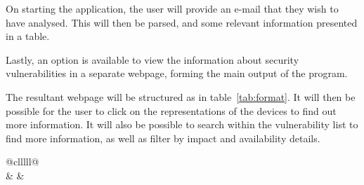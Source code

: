\documentclass[twoside,10pt]{scrreprt}
\begin{document}
On starting the application, the user will provide an e-mail that they wish to have analysed.  This will then be parsed, and some relevant information presented in a table. 

Lastly, an option is available to view the information about security vulnerabilities in a separate webpage, forming the main output of the program.

The resultant webpage will be structured as in table~\ref{tab:format}.  It will then be possible for the user to click on the representations of the devices to find out more information.  It will also be possible to search within the vulnerability list to find more information, as well as filter by impact and availability details.

\begin{table}[]
\centering
\begin{tabular}{@{}clllll@{}}
\toprule
{}                                                                                                                                                                                                                                      \\ \midrule
{} &  &  \\
                                                                                                                                                                                                \\
                                                                                                                                                                                  \\
                                                  \\
                                                                                                                                                                                                            \\ \bottomrule
\end{tabular}
\caption{Format of presented data found in e-mail header}
\label{tab:format}
\end{table}
\end{document}

